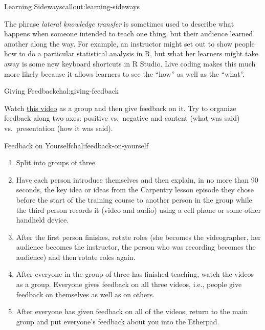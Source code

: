 \begin{callout}{Learning Sideways}{callout:learning-sideways}

The phrase \emph{lateral knowledge transfer} is sometimes used to
describe what happens when someone intended to teach one thing, but
their audience learned another along the way. For example, an instructor
might set out to show people how to do a particular statistical analysis
in R, but what her learners might take away is some new keyboard
shortcuts in R Studio. Live coding makes this much more likely because
it allows learners to see the ``how'' as well as the ``what''.
\end{callout}

\begin{challenge}{Giving Feedback}{chal:giving-feedback}

Watch \href{https://www.youtube.com/watch?v=-ApVt04rB4U}{this video} as
a group and then give feedback on it. Try to organize feedback along two
axes: positive vs.~negative and content (what was said) vs.~presentation
(how it was said).
\end{challenge}

\begin{challenge}{Feedback on Yourself}{chal:feedback-on-yourself}

\begin{enumerate}
\item
  Split into groups of three
\item
  Have each person introduce themselves and then explain, in no more
  than 90 seconds, the key idea or ideas from the Carpentry lesson
  episode they chose before the start of the training course to another
  person in the group while the third person records it (video and
  audio) using a cell phone or some other handheld device.
\item
  After the first person finishes, rotate roles (she becomes the
  videographer, her audience becomes the instructor, the person who was
  recording becomes the audience) and then rotate roles again.
\item
  After everyone in the group of three has finished teaching, watch the
  videos as a group. Everyone gives feedback on all three videos, i.e.,
  people give feedback on themselves as well as on others.
\item
  After everyone has given feedback on all of the videos, return to the
  main group and put everyone's feedback about you into the Etherpad.
\end{enumerate}
\end{challenge}

